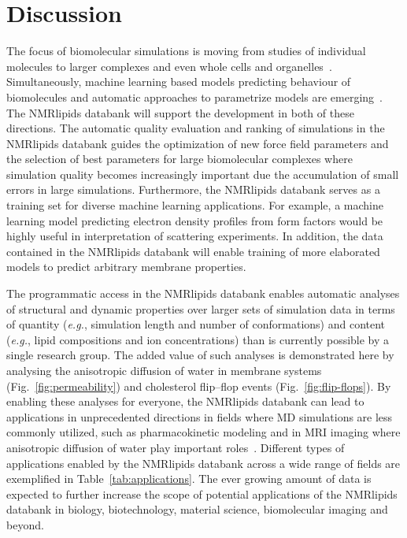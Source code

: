\documentclass[fleqn,10pt]{wlscirep}
\begin{document}
\section{Discussion}


The focus of biomolecular simulations is moving from studies of individual molecules to larger complexes and even whole cells and organelles~\cite{johnson15,thornburg22,gupta22}. Simultaneously, machine learning based models predicting behaviour of biomolecules and automatic approaches to parametrize models are emerging~\cite{jumper21,antila22b}. The NMRlipids databank will support the development in both of these directions. The automatic quality evaluation and ranking of simulations in the NMRlipids databank guides the optimization of new force field parameters and the selection of best parameters for large biomolecular complexes where simulation quality becomes increasingly important due the accumulation of small errors in large simulations. Furthermore, the NMRlipids databank serves as a training set for diverse machine learning applications. For example, a machine learning model predicting electron density profiles from form factors would be highly useful in interpretation of scattering experiments. In addition, the data contained in the NMRlipids databank will enable training of more elaborated models to predict arbitrary membrane properties. 


The programmatic access in the NMRlipids databank enables automatic analyses of structural and dynamic properties over larger sets of simulation data in terms of quantity (\textit{e.g.}, simulation length and number of conformations) and content (\textit{e.g.}, lipid compositions and ion concentrations) than is currently possible by a single research group. The added value of such analyses is demonstrated here by analysing the anisotropic diffusion of water in membrane systems (Fig.~\ref{fig:permeability}) and cholesterol flip--flop events (Fig.~\ref{fig:flip-flops}). By enabling these analyses for everyone, the NMRlipids databank can lead to applications in unprecedented directions in fields where MD simulations are less commonly utilized, such as pharmacokinetic modeling and in MRI imaging where anisotropic diffusion of water play important roles~\cite{nitsche19,topgaard20}. 
Different types of applications enabled by the NMRlipids databank across a wide range of fields are exemplified in Table~\ref{tab:applications}. The ever growing amount of data is expected to further increase the scope of potential applications of the NMRlipids databank in biology, biotechnology, material science, biomolecular imaging and beyond. 
\end{document}
